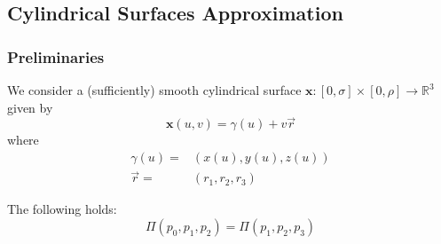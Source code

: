 \documentclass[ucs,9pt,pagenumbersfull]{beamer}
\begin{document}
\subsection{Cylindrical Surfaces Approximation}

\begin{frame}
  \frametitle{Preliminaries}
  We consider a (sufficiently) smooth cylindrical surface \(\mathbf{x}:
  [0,\sigma] \times [0,\rho] \to \mathbb{R}^3\) given by
  \[
  \mathbf{x}(u,v) = \gamma(u) +v \vec{r}
  \]
  where
  \begin{align*}
    \gamma(u) = & \left( x(u),y(u),z(u) \right) \\
    \vec{r} = & \left( r_1,r_2,r_3 \right)
  \end{align*}

  \begin{minipage}{0.5\linewidth}
    \begin{figure}
      \begin{center}
      \end{center}
    \end{figure}
  \end{minipage}
  \hfill
  \begin{minipage}{0.45\linewidth}
    The following holds:
    \[
    \Pi(p_0,p_1,p_2) = \Pi(p_1,p_2,p_3)
    \]

  \end{minipage}
\end{frame}
\end{document}

